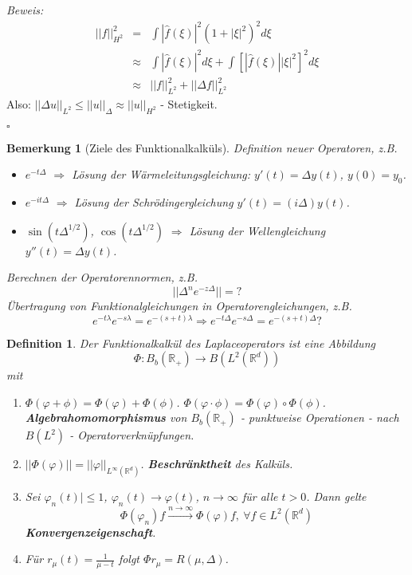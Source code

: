 \documentclass[12pt,a4paper,titlepage]{scrartcl}
\newtheorem{Definition}[Satz]{Definition}
\newtheorem{Bemerkung}[Satz]{Bemerkung}
\numberwithin{equation}{section}
\newcommand{\R}{\mathbb{R}} %
\newcommand{\f}{\hat{f}}
\newcommand{\m}{\cdot}
\newcommand{\Bew}{\emph{Beweis: }}
\newcommand{\qed}{\begin{flushright}
		$\square$
	\end{flushright}}
\begin{document}
	\Bew 
	\begin{eqnarray}
		||f||_{H^2}^2 &=& \int |\f(\xi)|^2(1+|\xi|^2)^2 d\xi\nonumber\\
		&\approx& \int |\f(\xi)|^2d\xi + \int\left[|\f(\xi)||\xi|^2 \right]^2d\xi\nonumber\\
		&\approx& ||f||_{L^2}^2 + ||\Delta f||_{L^2}^2\nonumber
	\end{eqnarray}
	Also: $||\Delta u||_{L^2} \leq ||u||_\Delta\approx ||u||_{H^2}$ - Stetigkeit.
	\qed
	
	\begin{Bemerkung}[Ziele des Funktionalkalküls]
		Definition neuer Operatoren, z.B.
		\begin{itemize}
			\item $e^{-t\Delta}$ $\Rightarrow$ Lösung der Wärmeleitungsgleichung: $y'(t)=\Delta y(t)$, $y(0) = y_0$.
			\item $e^{-i t\Delta}$ $\Rightarrow$ Lösung der Schrödingergleichung $y'(t) = (i\Delta) y(t)$.
			\item $\sin(t\Delta^{1/2})$, $\cos(t\Delta^{1/2})$ $\Rightarrow$ Lösung der Wellengleichung $y''(t) = \Delta y(t)$.
		\end{itemize}
		Berechnen der Operatorennormen, z.B.
		$$||\Delta^n e^{-z\Delta}|| = ?$$
		Übertragung von Funktionalgleichungen in Operatorengleichungen, z.B. 
		$$e^{-t\lambda}e^{-s\lambda} = e^{-(s+t)\lambda} \Rightarrow e^{-t\Delta}e^{-s\Delta} = e^{-(s+t)\Delta} ?$$
	\end{Bemerkung}
	
	\begin{Definition}
		Der Funktionalkalkül des Laplaceoperators ist eine Abbildung
		$$\Phi: B_b(\R_+)\rightarrow B(L^2(\R^d))$$
		mit
		\begin{enumerate}
			\item[(i)] $\Phi(\varphi +\phi) = \Phi(\varphi)+ \Phi(\phi)$. $\Phi(\varphi\m \phi) = \Phi(\varphi)\circ\Phi(\phi)$. \textbf{Algebrahomomorphismus} von $B_b(\R_+)$ - punktweise Operationen - nach $B(L^2)$ - Operatorverknüpfungen.
			\item[(ii)] $||\Phi(\varphi)|| = ||\varphi||_{L^{\infty}(\R^d)}$. \textbf{Beschränktheit} des Kalküls.
			\item[(iii)] Sei $\varphi_n(t)|\leq 1$, $\varphi_n(t)\rightarrow \varphi(t)$, $n\rightarrow\infty$ für alle $t>0$. Dann gelte
			$$\Phi(\varphi_n)f\overset{n\rightarrow\infty}{\longrightarrow} \Phi(\varphi)f, ~\forall f\in L^2(\R^d)$$
			\textbf{Konvergenzeigenschaft}.
			\item[(iv)] Für $r_\mu(t) =\frac{1}{\mu-t}$ folgt $\Phi r_\mu = R(\mu, \Delta)$.
		\end{enumerate}
	\end{Definition}
	
\end{document}
